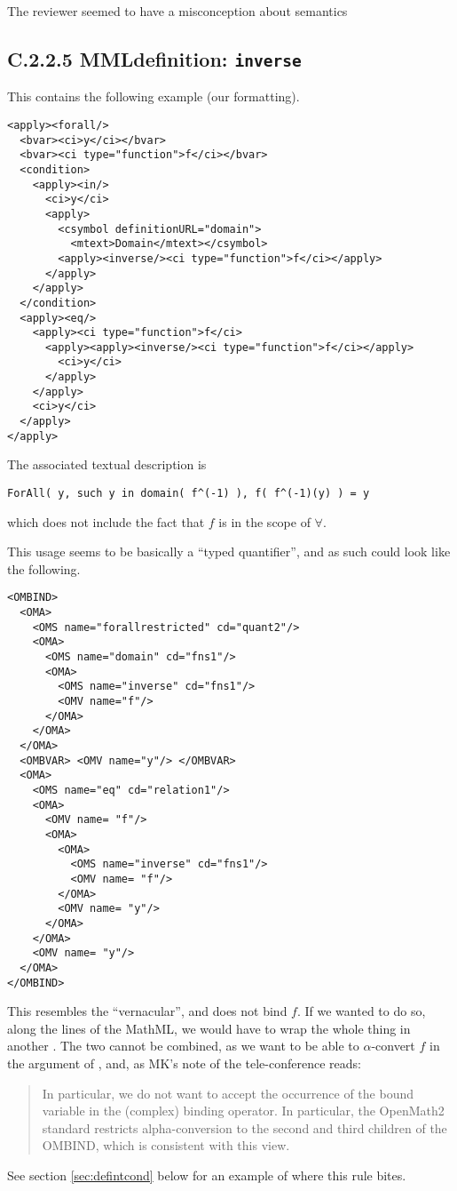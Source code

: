 \documentclass{llncs}
\begin{document}
\begin{newpart}{The reviewer seemed to have a misconception about semantics}
\subsection{C.2.2.5 MMLdefinition: {\tt inverse}}\label{C225}
This contains the following example (our formatting).
\begin{lstlisting}[language=MathML2]
<apply><forall/>
  <bvar><ci>y</ci></bvar>
  <bvar><ci type="function">f</ci></bvar>
  <condition>
    <apply><in/>
      <ci>y</ci>
      <apply>
        <csymbol definitionURL="domain">
          <mtext>Domain</mtext></csymbol>
        <apply><inverse/><ci type="function">f</ci></apply>
      </apply>
    </apply>
  </condition>
  <apply><eq/>
    <apply><ci type="function">f</ci>
      <apply><apply><inverse/><ci type="function">f</ci></apply>
        <ci>y</ci>
      </apply>
    </apply>
    <ci>y</ci>
  </apply>
</apply>
\end{lstlisting}
The associated textual description is 
\begin{lstlisting}
ForAll( y, such y in domain( f^(-1) ), f( f^(-1)(y) ) = y
\end{lstlisting}
which does not include the fact that $f$ is in the scope of $\forall$.
\par
This usage seems to be basically a ``typed quantifier'', and as such could
look like the following.
\begin{lstlisting}
<OMBIND>
  <OMA>
    <OMS name="forallrestricted" cd="quant2"/>
    <OMA>
      <OMS name="domain" cd="fns1"/>
      <OMA>
        <OMS name="inverse" cd="fns1"/>
        <OMV name="f"/>
      </OMA>
    </OMA>
  </OMA>
  <OMBVAR> <OMV name="y"/> </OMBVAR>
  <OMA>
    <OMS name="eq" cd="relation1"/>
    <OMA>
      <OMV name= "f"/>
      <OMA>
        <OMA>
          <OMS name="inverse" cd="fns1"/>
          <OMV name= "f"/>
        </OMA>
        <OMV name= "y"/>
      </OMA>
    </OMA>
    <OMV name= "y"/>
  </OMA>
</OMBIND>
\end{lstlisting}
This resembles the ``vernacular'', and does not bind $f$. If we wanted to do
so, along the lines of the MathML, we would have to wrap the whole thing in
another {}. The two cannot be combined, as we want to be able to
$\alpha$-convert $f$ in the argument of {}, and, as MK's
note of the tele-conference reads:
\begin{quotation}\noindent
In particular, we do not
      want to accept the occurrence of the bound variable in the
      (complex) binding operator. In particular, the OpenMath2 standard
      restricts alpha-conversion to the second and third children of the
      OMBIND, which is consistent with this view.
\end{quotation} 
See section \ref{sec:defintcond} below for an example of where this rule
bites.

\end{newpart}
\end{document}
